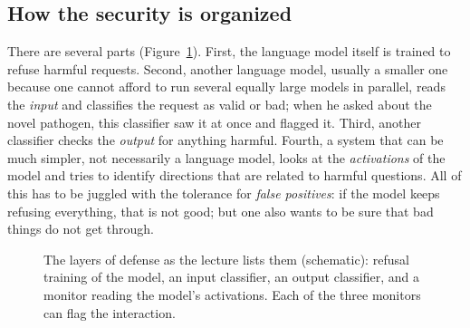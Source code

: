 \subsection{How the security is organized}\label{sec:L8-fourlayers}
There are several parts (Figure~\ref{fig:L8-layers}). First, the language model itself is trained to refuse harmful requests. Second, another language model, usually a smaller one because one cannot afford to run several equally large models in parallel, reads the \emph{input} and classifies the request as valid or bad; when he asked about the novel pathogen, this classifier saw it at once and flagged it. Third, another classifier checks the \emph{output} for anything harmful. Fourth, a system that can be much simpler, not necessarily a language model, looks at the \emph{activations} of the model and tries to identify directions that are related to harmful questions. All of this has to be juggled with the tolerance for \emph{false positives}: if the model keeps refusing everything, that is not good; but one also wants to be sure that bad things do not get through.

\begin{figure}[tb]
\centering
{}
\caption{The layers of defense as the lecture lists them (schematic): refusal training of the model, an input classifier, an output classifier, and a monitor reading the model's activations. Each of the three monitors can flag the interaction.}
\label{fig:L8-layers}
\end{figure}

